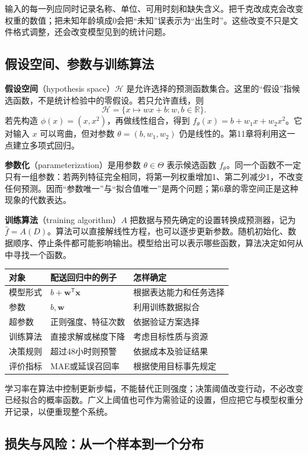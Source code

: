 \documentclass[UTF8,fontset=none,zihao=-4,a4paper]{ctexart}
\newcommand{\term}[1]{\textbf{#1}}
\numberwithin{equation}{section}
\numberwithin{figure}{section}
\begin{document}
输入的每一列应同时记录名称、单位、可用时刻和缺失含义。把千克改成克会改变权重的数值；把未知年龄填成0会把“未知”误表示为“出生时”。这些改变不只是文件格式调整，还会改变模型见到的统计问题。

\subsection{假设空间、参数与训练算法}
\term{假设空间}（hypothesis space）$\mathcal H$ 是允许选择的预测函数集合。这里的“假设”指候选函数，不是统计检验中的零假设。若只允许直线，则
\[
 \mathcal H=\{x\mapsto wx+b:w,b\in\mathbb R\}.
\]
若先构造 $\phi(x)=(x,x^2)$，再做线性组合，得到 $f_\theta(x)=b+w_1x+w_2x^2$。它对输入 $x$ 可以弯曲，但对参数 $\theta=(b,w_1,w_2)$ 仍是线性的。第11章将利用这一点建立多项式回归。

\term{参数化}（parameterization）是用参数 $\theta\in\Theta$ 表示候选函数 $f_\theta$。同一个函数不一定只有一组参数：若两列特征完全相同，将第一列权重增加1、第二列减少1，不改变任何预测。因而“参数唯一”与“拟合值唯一”是两个问题；第6章的零空间正是这种现象的代数表达。

\term{训练算法}（training algorithm）$A$ 把数据与预先确定的设置转换成预测器，记为 $\widehat f=A(D)$。算法可以直接解线性方程，也可以逐步更新参数。随机初始化、数据顺序、停止条件都可能影响输出。模型给出可以表示哪些函数，算法决定如何从中寻找一个函数。

\begin{center}
\begin{tabularx}{\linewidth}{l Y Y}
\toprule
对象 & 配送回归中的例子 & 怎样确定\\\midrule
模型形式 & $b+\symbf w^{\mathsf T}\symbf x$ & 根据表达能力和任务选择\\
参数 & $b,\symbf w$ & 利用训练数据拟合\\
超参数 & 正则强度、特征次数 & 依据验证方案选择\\
训练算法 & 直接求解或梯度下降 & 考虑目标性质与资源\\
决策规则 & 超过48小时则预警 & 依据成本及验证结果\\
评价指标 & MAE或延误召回率 & 根据使用目标事先规定\\\bottomrule
\end{tabularx}
\end{center}
学习率在算法中控制更新步幅，不能替代正则强度；决策阈值改变行动，不必改变已经拟合的概率函数。广义上阈值也可作为需验证的设置，但应把它与模型权重分开记录，以便重现整个系统。

\subsection{损失与风险：从一个样本到一个分布}
\end{document}
